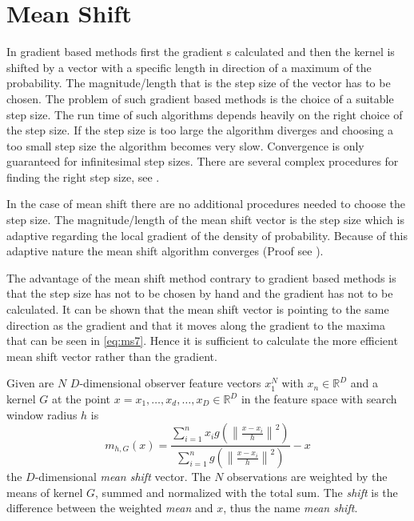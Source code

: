 \section{Mean Shift} %
\label{sec:mean_shift}
In gradient based methods first the gradient s calculated and then the
kernel is shifted by a vector with a specific length in direction of a
maximum of the probability. The magnitude/length that is the step size
of the vector has to be chosen. The problem of such gradient based
methods is the choice of a suitable step size. The run time of such
algorithms depends heavily on the right choice of the step size. If
the step size is too large the algorithm diverges and choosing a too
small step size the algorithm becomes very slow. Convergence is only
guaranteed for infinitesimal step sizes. There are several complex
procedures for finding the right step size, see
\citeauthor{citeulike:462300} \citep{citeulike:462300}.

In the case of mean shift there are no additional procedures needed to
choose the step size. The magnitude/length of the mean shift vector is
the step size which is adaptive regarding the local gradient of the
density of probability.  Because of this adaptive nature the mean
shift algorithm converges (Proof see \citeauthor{citeulike:462300}
\citep{citeulike:462300}).

The advantage of the mean shift method contrary to gradient based
methods is that the step size has not to be chosen by hand and the
gradient has not to be calculated. It can be shown that the mean shift
vector is pointing to the same direction as the gradient and that it
moves along the gradient to the maxima that can be seen in
\autoref{eq:ms7}. Hence it is sufficient to calculate the more
efficient mean shift vector rather than the gradient.

Given are $N$ $D$-dimensional observer feature vectors $x_1^N$ with
$x_n \in \mathbb{R}^D$ and a kernel $G$ at the point $x = {x_1, \ldots
  , x_d, \ldots , x_D} \in \mathbb{R}^D$ in the feature space with
search window radius $h$ is
\begin{equation}\label{eq:ms0}
  m_{h,G}(x) = \frac{\sum_{i=1}^n x_i g\left(\left\lVert \frac{x - x_i}{h}
      \right\rVert^2\right)}{\sum_{i=1}^n g\left(\left\lVert \frac{x - x_i}{h}
      \right\rVert^2\right)} -x
\end{equation}
the $D$-dimensional \textit{mean shift} vector. The $N$ observations
are weighted by the means of kernel $G$, summed and normalized with
the total sum.  The \emph{shift} is the difference between the
weighted \emph{mean} and $x$, thus the name \emph{mean shift}.

